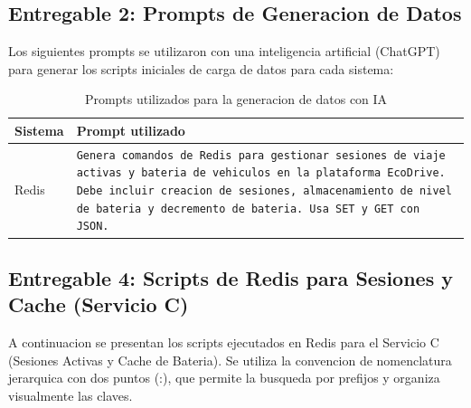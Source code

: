 \documentclass[12pt,a4paper]{article}
\begin{document}
\begin{table}[h]
\centering
{}
\caption{Asignacion de SGBD a servicios y elementos de diseno}
\end{table}

\newpage

\subsection{Entregable 2: Prompts de Generacion de Datos}

Los siguientes prompts se utilizaron con una inteligencia artificial (ChatGPT) para generar los scripts iniciales de carga de datos para cada sistema:

\begin{table}[h]
\centering
\begin{tabular}{|l|p{10cm}|}
\hline
\textbf{Sistema} & \textbf{Prompt utilizado} \\
\hline
Redis & \texttt{Genera comandos de Redis para gestionar sesiones de viaje activas y bateria de vehiculos en la plataforma EcoDrive. Debe incluir creacion de sesiones, almacenamiento de nivel de bateria y decremento de bateria. Usa SET y GET con JSON.} \\
\hline
\end{tabular}
\caption{Prompts utilizados para la generacion de datos con IA}
\end{table}

\subsection{Entregable 4: Scripts de Redis para Sesiones y Cache (Servicio C)}

A continuacion se presentan los scripts ejecutados en Redis para el Servicio C (Sesiones Activas y Cache de Bateria). Se utiliza la convencion de nomenclatura jerarquica con dos puntos (:), que permite la busqueda por prefijos y organiza visualmente las claves.
\end{document}
